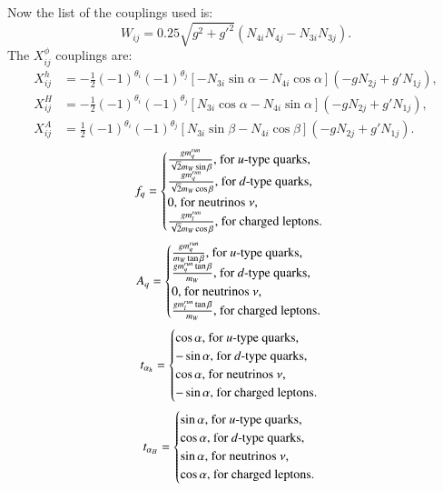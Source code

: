 \documentclass[final,3p,times]{elsarticle}
\begin{document}
Now the list of the couplings used is:
\begin{equation}
W_{ij} = 0.25\sqrt{g^2 + g'^2}(N_{4i}N_{4j}- N_{3i}N_{3j}).
\end{equation}
The $X_{ij}^{\phi}$ couplings are:
\begin{align}
X_{ij}^h &= -\frac{1}{2}(-1)^{\theta_i}(-1)^{\theta_j}[-N_{3i}\sin\alpha - N_{4i} \cos\alpha](-gN_{2j}+g'N_{1j}), \\
X_{ij}^H &= -\frac{1}{2}(-1)^{\theta_i}(-1)^{\theta_j}[N_{3i}\cos\alpha - N_{4i} \sin\alpha](-gN_{2j}+g'N_{1j}), \\ 
X_{ij}^A &= \frac{1}{2}(-1)^{\theta_i}(-1)^{\theta_j}[N_{3i}\sin\beta - N_{4i} \cos\beta](-gN_{2j}+g'N_{1j}).
\end{align}
\begin{equation}
f_{q} = \begin{cases}
{gm_{q}^{run} \over \sqrt{2} m_{W} \sin\beta}, $ for $u$-type quarks,$ \\
{gm_{q}^{run} \over \sqrt{2} m_{W} \cos\beta}, $ for $d$-type quarks,$ \\
0, $ for neutrinos $ \nu$,$ \\
{gm_{l}^{run} \over \sqrt{2} m_{W} \cos\beta}, $ for charged leptons$. \\
\end{cases}
\end{equation}
\begin{equation}
A_{q} = \begin{cases}
{g m_{q}^{run} \over m_{W} \tan\beta}, $ for $u$-type quarks,$ \\
{g m_{q}^{run} \tan\beta \over m_{W}}, $ for $d$-type quarks,$ \\
{0}, $ for neutrinos $ \nu$,$ \\
{g m_{l}^{run} \tan\beta \over m_{W}}, $ for charged leptons$. 
\end{cases}
\end{equation}
\begin{equation}
t_{\alpha_h} = \begin{cases}
\cos\alpha, $ for $u$-type quarks,$ \\
-\sin\alpha, $ for $d$-type quarks,$ \\
\cos\alpha, $ for neutrinos $ \nu$,$ \\
-\sin\alpha, $ for charged leptons$. 
\end{cases}
\end{equation}
\begin{equation}
t_{\alpha_H} = \begin{cases}
\sin\alpha, $ for $u$-type quarks,$ \\
\cos\alpha, $ for $d$-type quarks,$ \\
\sin\alpha, $ for neutrinos $ \nu$,$ \\
\cos\alpha, $ for charged leptons$. 
\end{cases}
\end{equation}
\end{document}
